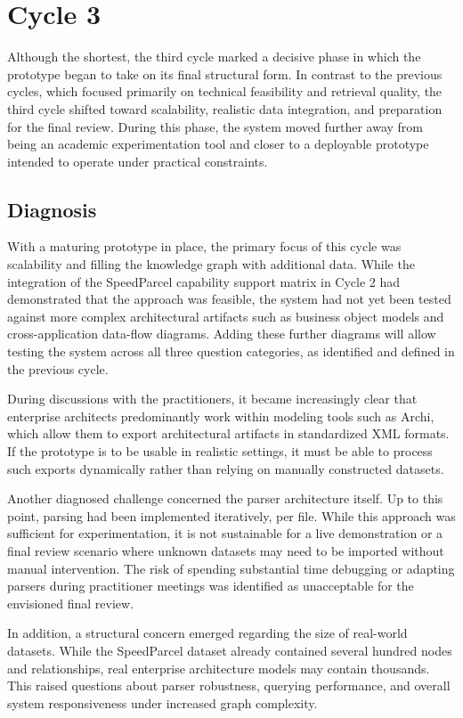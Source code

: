\chapter{Cycle 3}
\label{ch:cycle3}
Although the shortest, the third cycle marked a decisive phase in which the prototype began to take on its final structural form. In contrast to the previous cycles, which focused primarily on technical feasibility and retrieval quality, the third cycle shifted toward scalability, realistic data integration, and preparation for the final review. During this phase, the system moved further away from being an academic experimentation tool and closer to a deployable prototype intended to operate under practical constraints.

\section{Diagnosis}
\label{sec:cycle3_diagnosis}
With a maturing prototype in place, the primary focus of this cycle was scalability and filling the knowledge graph with additional data. While the integration of the SpeedParcel capability support matrix in Cycle 2 had demonstrated that the approach was feasible, the system had not yet been tested against more complex architectural artifacts such as business object models and cross-application data-flow diagrams. Adding these further diagrams will allow testing the system across all three question categories, as identified and defined in the previous cycle.

During discussions with the practitioners, it became increasingly clear that enterprise architects predominantly work within modeling tools such as Archi, which allow them to export architectural artifacts in standardized XML formats. If the prototype is to be usable in realistic settings, it must be able to process such exports dynamically rather than relying on manually constructed datasets.

Another diagnosed challenge concerned the parser architecture itself. Up to this point, parsing had been implemented iteratively, per file. While this approach was sufficient for experimentation, it is not sustainable for a live demonstration or a final review scenario where unknown datasets may need to be imported without manual intervention. The risk of spending substantial time debugging or adapting parsers during practitioner meetings was identified as unacceptable for the envisioned final review.

In addition, a structural concern emerged regarding the size of real-world datasets. While the SpeedParcel dataset already contained several hundred nodes and relationships, real enterprise architecture models may contain thousands. This raised questions about parser robustness, querying performance, and overall system responsiveness under increased graph complexity.

